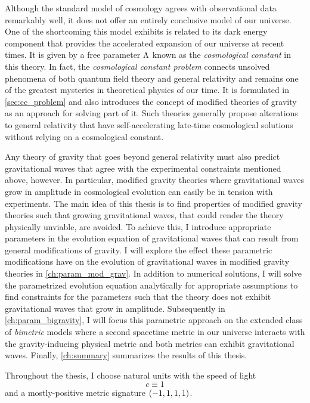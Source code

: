 \documentclass[12pt,parskip=half]{scrreprt}
\begin{document}
Although the \LCDM standard model of cosmology agrees with observational data remarkably well, it does not offer an entirely conclusive model of our universe. One of the shortcoming this model exhibits is related to its dark energy component that provides the accelerated expansion of our universe at recent times. It is given by a free parameter \(\Lambda\) known as the \emph{cosmological constant} in this theory. In fact, the \emph{cosmological constant problem} connects unsolved phenomena of both quantum field theory and general relativity and remains one of the greatest mysteries in theoretical physics of our time. It is formulated in \autoref{sec:cc_problem} and also introduces the concept of modified theories of gravity as an approach for solving part of it. Such theories generally propose alterations to general relativity that have self-accelerating late-time cosmological solutions without relying on a cosmological constant.

Any theory of gravity that goes beyond general relativity must also predict gravitational waves that agree with the experimental constraints mentioned above, however. In particular, modified gravity theories where gravitational waves grow in amplitude in cosmological evolution can easily be in tension with experiments. The main idea of this thesis is to find properties of modified gravity theories such that growing gravitational waves, that could render the theory physically unviable, are avoided. To achieve this, I introduce appropriate parameters in the evolution equation of gravitational waves that can result from general modifications of gravity. I will explore the effect these parametric modifications have on the evolution of gravitational waves in modified gravity theories in \autoref{ch:param_mod_grav}. In addition to numerical solutions, I will solve the parametrized evolution equation analytically for appropriate assumptions to find constraints for the parameters such that the theory does not exhibit gravitational waves that grow in amplitude. Subsequently in \autoref{ch:param_bigravity}, I will focus this parametric approach on the extended class of \emph{bimetric} models where a second spacetime metric in our universe interacts with the gravity-inducing physical metric and both metrics can exhibit gravitational waves. Finally, \autoref{ch:summary} summarizes the results of this thesis.

Throughout the thesis, I choose natural units with the speed of light
\begin{equation}
	c \equiv 1
\end{equation}
and a mostly-positive metric signature \(\del{-1,1,1,1}\).
\end{document}
